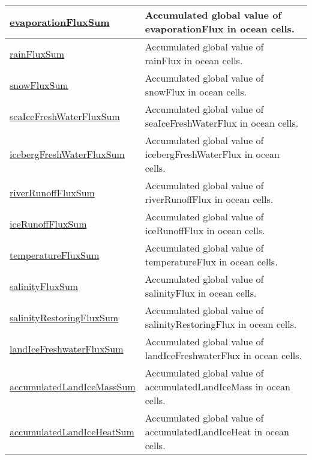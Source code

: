 {\begin{center}
\begin{longtable}{| p{2.0in} | p{4.0in} |}
    \hline
    \hyperref[subsec:var_sec_globalStatsAM_evaporationFluxSum]{evaporationFluxSum} & Accumulated global value of evaporationFlux in ocean cells. \\
    \hline
    \hyperref[subsec:var_sec_globalStatsAM_rainFluxSum]{rainFluxSum} & Accumulated global value of rainFlux in ocean cells. \\
    \hline
    \hyperref[subsec:var_sec_globalStatsAM_snowFluxSum]{snowFluxSum} & Accumulated global value of snowFlux in ocean cells. \\
    \hline
    \hyperref[subsec:var_sec_globalStatsAM_seaIceFreshWaterFluxSum]{seaIceFreshWaterFluxSum} & Accumulated global value of seaIceFreshWaterFlux in ocean cells. \\
    \hline
    \hyperref[subsec:var_sec_globalStatsAM_icebergFreshWaterFluxSum]{icebergFreshWaterFluxSum} & Accumulated global value of icebergFreshWaterFlux in ocean cells. \\
    \hline
    \hyperref[subsec:var_sec_globalStatsAM_riverRunoffFluxSum]{riverRunoffFluxSum} & Accumulated global value of riverRunoffFlux in ocean cells. \\
    \hline
    \hyperref[subsec:var_sec_globalStatsAM_iceRunoffFluxSum]{iceRunoffFluxSum} & Accumulated global value of iceRunoffFlux in ocean cells. \\
    \hline
    \hyperref[subsec:var_sec_globalStatsAM_temperatureFluxSum]{temperatureFluxSum} & Accumulated global value of temperatureFlux in ocean cells. \\
    \hline
    \hyperref[subsec:var_sec_globalStatsAM_salinityFluxSum]{salinityFluxSum} & Accumulated global value of salinityFlux in ocean cells. \\
    \hline
    \hyperref[subsec:var_sec_globalStatsAM_salinityRestoringFluxSum]{salinityRestoringFluxSum} & Accumulated global value of salinityRestoringFlux in ocean cells. \\
    \hline
    \hyperref[subsec:var_sec_globalStatsAM_landIceFreshwaterFluxSum]{landIceFreshwaterFluxSum} & Accumulated global value of landIceFreshwaterFlux in ocean cells. \\
    \hline
    \hyperref[subsec:var_sec_globalStatsAM_accumulatedLandIceMassSum]{accumulatedLandIceMassSum} & Accumulated global value of accumulatedLandIceMass in ocean cells. \\
    \hline
    \hyperref[subsec:var_sec_globalStatsAM_accumulatedLandIceHeatSum]{accumulatedLandIceHeatSum} & Accumulated global value of accumulatedLandIceHeat in ocean cells. \\

\end{longtable}
\end{center}}
